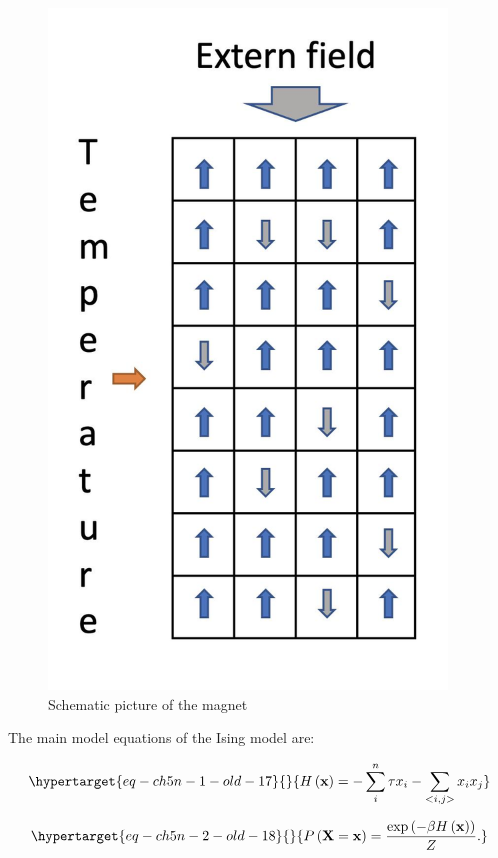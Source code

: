 \documentclass[
  a4paper,
  DIV=11,
  numbers=noendperiod]{scrreprt}
\begin{document}
\begin{figure}

{\centering \includegraphics[width=4.16667in,height=\textheight]{media/ch5n/image1.jpg}

}

\caption{\label{fig-ch5n-img1-old-39}Schematic picture of the magnet}

\end{figure}

The main model equations of the Ising model are:

\begin{equation}\protect\hypertarget{eq-ch5n-1-old-17}{}{
H\left( \mathbf{x} \right) = - \sum_{i}^{n}{\tau x_{i}} - \sum_{< i,j >}^{}{x_{i}x_{j}}}\label{eq-ch5n-1-old-17}\end{equation}

\begin{equation}\protect\hypertarget{eq-ch5n-2-old-18}{}{
P\left( \mathbf{X} = \mathbf{x} \right) = \frac{\exp\left( - \beta H\left( \mathbf{x} \right) \right)}{Z}.}\label{eq-ch5n-2-old-18}\end{equation}
\end{document}
